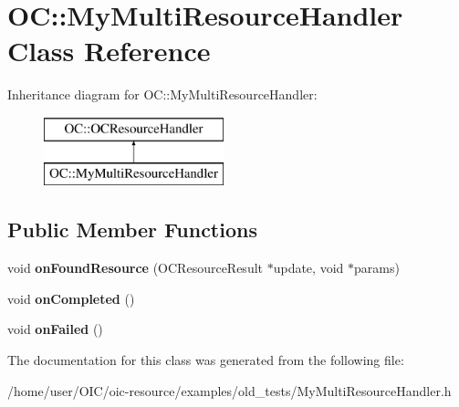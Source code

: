 \hypertarget{classOC_1_1MyMultiResourceHandler}{}\section{O\+C\+:\+:My\+Multi\+Resource\+Handler Class Reference}
\label{classOC_1_1MyMultiResourceHandler}
Inheritance diagram for O\+C\+:\+:My\+Multi\+Resource\+Handler\+:\begin{figure}[H]
\begin{center}
\leavevmode
\includegraphics[height=2.000000cm]{classOC_1_1MyMultiResourceHandler}
\end{center}
\end{figure}
\subsection*{Public Member Functions}
\begin{DoxyCompactItemize}
\item 
\hypertarget{classOC_1_1MyMultiResourceHandler_a542edaaedfc1c7bc25a4dba4b7f56b66}{}void {\bfseries on\+Found\+Resource} (O\+C\+Resource\+Result $\ast$update, void $\ast$params)\label{classOC_1_1MyMultiResourceHandler_a542edaaedfc1c7bc25a4dba4b7f56b66}

\item 
\hypertarget{classOC_1_1MyMultiResourceHandler_a3472b8a1bc575a39a984f05a5bdfc390}{}void {\bfseries on\+Completed} ()\label{classOC_1_1MyMultiResourceHandler_a3472b8a1bc575a39a984f05a5bdfc390}

\item 
\hypertarget{classOC_1_1MyMultiResourceHandler_ac1cecae8532c84dbf7ac07c37e07e6f6}{}void {\bfseries on\+Failed} ()\label{classOC_1_1MyMultiResourceHandler_ac1cecae8532c84dbf7ac07c37e07e6f6}

\end{DoxyCompactItemize}


The documentation for this class was generated from the following file\+:\begin{DoxyCompactItemize}
\item 
/home/user/\+O\+I\+C/oic-\/resource/examples/old\+\_\+tests/My\+Multi\+Resource\+Handler.\+h\end{DoxyCompactItemize}
